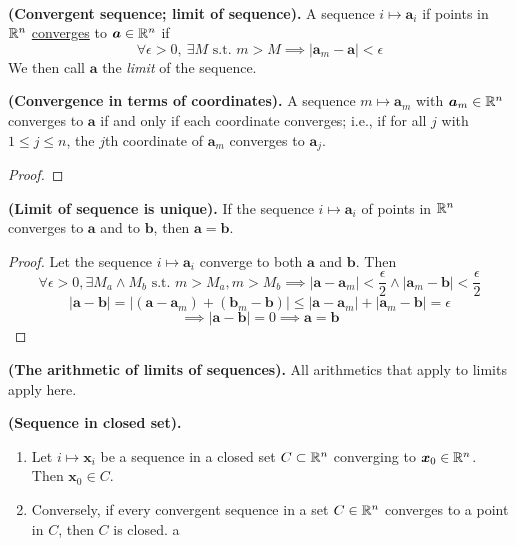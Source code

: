 \\

\begin{defn}
\textbf{(Convergent sequence; limit of sequence).} A sequence $i \mapsto \bm{a}_i$ if points in $\mathbb{R}^n$ \ul{converges} to $\bm{a}\in \mathbb{R}^n$ if
\[\forall \epsilon > 0,\ \exists M \text{ s.t. } m > M \implies |\bm{a}_m-\bm{a}| < \epsilon\]
We then call $\bm{a}$ the \textit{limit} of the sequence.
\end{defn}

\begin{proposition}
  \textbf{(Convergence in terms of coordinates).} A sequence $m\mapsto \bm{a}_m$ with $\bm{a}_m\in\mathbb{R}^n$ converges to $\bm{a}$ if and only if each coordinate converges; i.e., if for all $j$ with $1\leq j\leq n$, the $j$th coordinate of $\bm{a}_m$ converges to $\bm{a}_j$.
\end{proposition}

\begin{proof}

\end{proof}

\begin{proposition}
\textbf{(Limit of sequence is unique). } If the sequence $i\mapsto \bm{a}_i$ of points in $\mathbb{R}^n$ converges to $\bm{a}$ and to $\bm{b}$, then $\bm{a}=\bm{b}$.
\end{proposition}

\begin{proof}
Let the sequence $i\mapsto \bm{a}_i$ converge to both $\bm{a}$ and $\bm{b}$. Then \[\forall \epsilon > 0, \exists M_a \land M_b \text{ s.t. } m > M_a, m > M_b \implies |\bm{a}-\bm{a}_{m}| < \frac{\epsilon}{2} \land |\bm{a}_{m} - \bm{b}| < \frac{\epsilon}{2}\]
\[|\bm{a}-\bm{b}|=|(\bm{a}-\bm{a}_m)+(\bm{b}_m-\bm{b})| \leq |\bm{a}-\bm{a}_{m}|+ |\bm{a}_{m} - \bm{b}| = \epsilon\]
\[\implies |\bm{a}-\bm{b}| = 0 \implies \bm{a}=\bm{b}\]
\end{proof}

\begin{theorem}
\textbf{(The arithmetic of limits of sequences). } All arithmetics that apply to limits apply here.
\end{theorem}

\begin{proposition}
\textbf{(Sequence in closed set).}
\begin{enumerate}
  \item Let $i\mapsto \bm{x}_i$ be a sequence in a closed set $C \subset \mathbb{R}^n$ converging to $\bm{x}_0\in \mathbb{R}^n$. Then $\bm{x}_0\in C$.
  \item Conversely, if every convergent sequence in a set $C \in \mathbb{R}^n$ converges to a point in $C$, then $C$ is closed. a
\end{enumerate}
\end{proposition}
